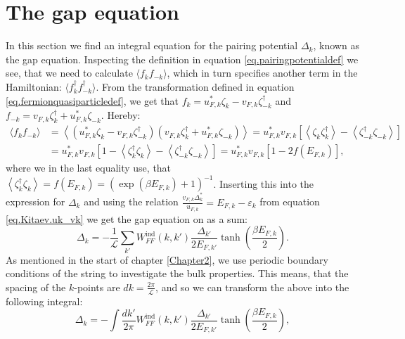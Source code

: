 \section{The gap equation} \label{sec.pairingpotential.integralequation}
In this section we find an integral equation for the pairing potential $\Delta_k$, known as the gap equation. Inspecting the definition in equation \eqref{eq.pairingpotentialdef} we see, that we need to calculate $\langle f_k f_{-k} \rangle$, which in turn specifies another term in the Hamiltonian: $\langle f^\dagger_k f^\dagger_{-k} \rangle$. From the transformation defined in equation \eqref{eq.fermionquasiparticledef}, we get that $f_k = u^*_{F,k}\zeta_k - v_{F,k}\zeta^\dagger_{-k}$ and $f_{-k} = v_{F,k}\zeta^\dagger_k + u^*_{F,k}\zeta_{-k}$. Hereby:
\begin{align}
\langle f_k f_{-k} \rangle &= \left \langle (u^*_{F,k}\zeta_k - v_{F,k}\zeta^\dagger_{-k}) (v_{F,k}\zeta^\dagger_k + u^*_{F,k}\zeta_{-k}) \right \rangle = u^*_{F,k}v_{F,k}\left[ \left \langle \zeta_k \zeta^\dagger_{k} \right \rangle - \left \langle \zeta^\dagger_{-k} \zeta_{-k} \right \rangle \right]  \nonumber \\
& =  u^*_{F,k}v_{F,k}\left[ 1 - \left \langle \zeta^\dagger_{k} \zeta_k \right \rangle - \left \langle \zeta^\dagger_{-k} \zeta_{-k} \right \rangle \right] = u^*_{F,k}v_{F,k}\left[1 - 2f(E_{F,k})\right], \nonumber
\end{align}
where we in the last equality use, that $\left \langle \zeta^\dagger_{k} \zeta_{k} \right \rangle = f(E_{F,k})=(\exp(\beta E_{F,k})+1)^{-1} $. Inserting this into the expression for $\Delta_k$ and using the relation $\frac{v_{F,k}\Delta^*_k}{u_{F,k}}=E_{F,k}-\varepsilon_k$ from equation \eqref{eq.Kitaev.uk_vk} we get the gap equation on as a sum:
\begin{equation}
\Delta_k = - \frac{1}{\mathcal{L}}\sum_{k'} W^\text{ind}_{FF}(k,k')\frac{\Delta_{k'}}{2E_{F,k'}}\tanh\left(\frac{\beta E_{F,k}}{2}\right).
\label{eq.GapequationSum}
\end{equation} 
As mentioned in the start of chapter \ref{Chapter2}, we use periodic boundary conditions of the string to investigate the bulk properties. This means, that the spacing of the $k$-points are $dk = \frac{2\pi}{\mathcal{L}}$, and so we can transform the above into the following integral:
\begin{equation}
\Delta_k = - \int \frac{dk'}{2\pi} W^\text{ind}_{FF}(k,k')\frac{\Delta_{k'}}{2E_{F,k'}}\tanh\left(\frac{\beta E_{F,k}}{2}\right), 
\label{eq.GapequationIntegral}
\end{equation} 
